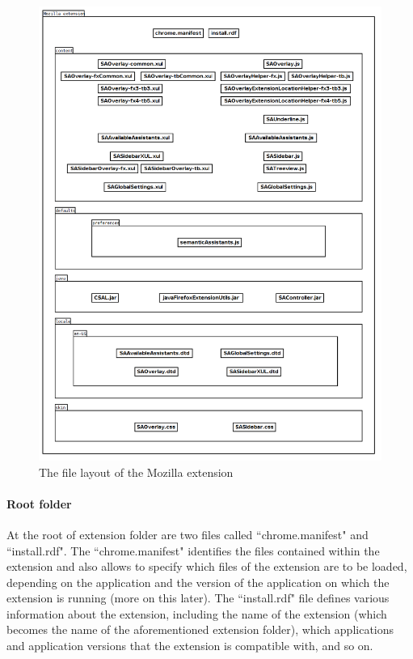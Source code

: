 \begin{figure}[htb]
  \centering
  \includegraphics[totalheight=0.8\textheight]{pictures/mozilla_development_notes_file_layout.png}
  \caption{The file layout of the Mozilla extension}
  \label{fig:mozilla_development_notes_file_layout}
\end{figure}

\paragraph{Root folder} At the root of extension folder are two files called ``chrome.manifest" and ``install.rdf". The ``chrome.manifest" identifies the files contained within the extension and also allows to specify which files of the extension are to be loaded, depending on the application and the version of the application on which the extension is running (more on this later). The ``install.rdf" file defines various information about the extension, including the name of the extension (which becomes the name of the aforementioned extension folder), which applications and application versions that the extension is compatible with, and so on. 
